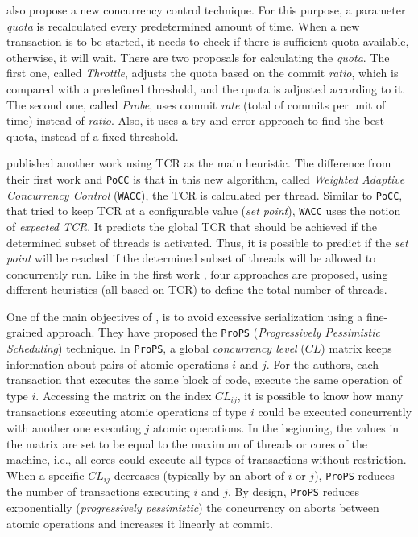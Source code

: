  also propose a new concurrency control technique. For this purpose, a parameter \emph{quota} is recalculated every predetermined amount of time. When a new transaction is to be started, it needs to check if there is sufficient quota available, otherwise, it will wait. There are two proposals for calculating the \emph{quota}. The first one, called \emph{Throttle}, adjusts the quota based on the commit \emph{ratio}, which is compared with a predefined threshold, and the quota is adjusted according to it. The second one, called \emph{Probe}, uses commit \emph{rate} (total of commits per unit of time) instead of \emph{ratio}. Also, it uses a try and error approach to find the best quota, instead of a fixed threshold. 

 published another work using TCR as the main heuristic. The difference from their first work \cite{Ansari:2008_1} and \texttt{PoCC} is that in this new algorithm, called \emph{Weighted Adaptive Concurrency Control} (\texttt{WACC}), the TCR is calculated per thread. Similar to \texttt{PoCC}, that tried to keep TCR at a configurable value (\emph{set point}), \texttt{WACC} uses the notion of \emph{expected TCR}. It predicts the global TCR that should be achieved if the determined subset of threads is activated. Thus, it is possible to predict if the \emph{set point} will be reached if the determined subset of threads will be allowed to concurrently run. Like in the first work \cite{Ansari:2008_1}, four approaches are proposed, using different heuristics (all based on TCR) to define the total number of threads. 

One of the main objectives of , is to avoid excessive serialization using a fine-grained approach. They have proposed the \texttt{ProPS} (\emph{Progressively Pessimistic Scheduling}) technique. In \texttt{ProPS}, a global \emph{concurrency level} ($CL$) matrix  keeps information about pairs of atomic operations $i$ and $j$. For the authors, each transaction that executes the same block of code, execute the same operation of type $i$. Accessing the matrix on the index $CL_{ij}$, it is possible to know how many transactions executing atomic operations of type $i$ could be executed concurrently with another one executing $j$ atomic operations. In the beginning, the values in the matrix are set to be equal to the maximum of threads or cores of the machine, i.e., all cores could execute all types of transactions without restriction. When a specific $CL_{ij}$ decreases (typically by an abort of $i$ or $j$), \texttt{ProPS} reduces the number of transactions executing $i$ and $j$. By design, \texttt{ProPS} reduces exponentially (\emph{progressively pessimistic}) the concurrency on aborts between atomic operations and increases it linearly at commit. 

